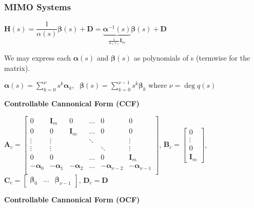 \documentclass[11pt]{article}
\begin{document}
  \pagebreak

  \subsubsection{MIMO Systems}

  \(\bm{H}(s) = \dfrac{1}{\alpha(s)}\bm{\beta}(s) + \bm{D} =
  \underbrace{\bm{\alpha}^{-1}(s)}_{\frac{1}{\alpha(s)}\bm{I}_m}\bm{\beta}(s) + \bm{D}\)

  We may express each \(\bm{\alpha}(s)\) and \(\bm{\beta}(s)\) as polynomials of s
  (termwise for the matrix).

  \(\bm{\alpha}(s) = \displaystyle \sum_{k = 0}^{\nu} s^k\bm{\alpha}_k\),
  \(\ \ \bm{\beta}(s) = \displaystyle \sum_{k = 0}^{\nu - 1} s^k\bm{\beta}_k\) where \(\nu = \deg{q(s)}\)

  \textbf{Controllable Cannonical Form (CCF)}

  \vspace{12pt}

  \(\bm{A}_c =
  \begin{bmatrix}
    0 & \bm{I}_m & 0 & \dots & 0 & 0 \\
    0 & 0 & \bm{I}_m & \dots & 0 & 0 \\
    \vdots & \vdots & & \ddots & & \vdots \\
    \vdots & \vdots & & & \ddots & \vdots \\
    0 & 0 & & \dots & 0 & \bm{I}_m \\
    -\bm{\alpha}_0 & -\bm{\alpha}_1 & -\bm{\alpha}_2 & \dots & -\bm{\alpha}_{\nu - 2} & -\bm{\alpha}_{\nu - 1} \\
  \end{bmatrix}\),
  \(\bm{B}_c =
  \begin{bmatrix}
     0 \\
     \vdots \\
     0 \\
     \bm{I}_m
  \end{bmatrix}\),
  \(\bm{C}_c = \begin{bmatrix} \bm{\beta}_0 & \dots & \bm{\beta}_{\nu - 1}\end{bmatrix}\),
  \(\bm{D}_c = \bm{D}\)

  \textbf{Controllable Cannonical Form (OCF)}

  \vspace{12pt}
\end{document}
